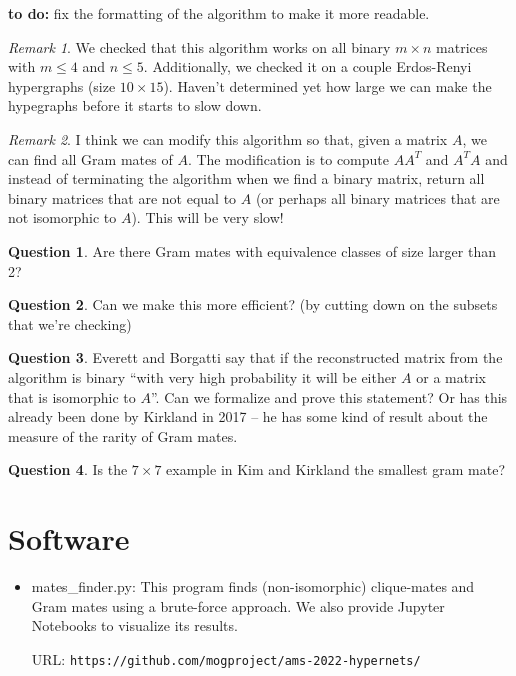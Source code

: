 \documentclass[11pt]{article}
\theoremstyle{definition}
\newtheorem{question}{Question}
\theoremstyle{remark}
\newtheorem{remark}{Remark}
\begin{document}
{\bf to do:} fix the formatting of the algorithm to make it more readable. 
	
\begin{remark}
We checked that this algorithm works on all binary $m \times n$ matrices with $m \leq 4$ and $n \leq 5$. Additionally, we checked it on a couple Erdos-Renyi hypergraphs (size $10 \times 15$). Haven't determined yet how large we can make the hypegraphs before it starts to slow down. 
\end{remark}
	
\begin{remark}
I think we can modify this algorithm so that, given a matrix $A$, we can find all Gram mates of $A$. The modification is to compute $AA^{T}$ and $A^{T}A$ and instead of terminating the algorithm when we find a binary matrix, return all binary matrices that are not equal to $A$ (or perhaps all binary matrices that are not isomorphic to $A$). This will be very slow!
\end{remark}

\begin{question}
Are there Gram mates with equivalence classes of size larger than 2?
\end{question}

\begin{question}
Can we make this more efficient? (by cutting down on the subsets that we're checking)
\end{question}

\begin{question}
Everett and Borgatti say that if the reconstructed matrix from the algorithm is binary ``with very high probability it will be either $A$ or a matrix that is isomorphic to $A$''. Can we formalize and prove this statement? Or has this already been done by Kirkland in 2017 -- he has some kind of result about the measure of the rarity of Gram mates. 
\end{question}

\begin{question}
Is the $7 \times 7$ example in Kim and Kirkland \cite{Kirkland} the smallest gram mate?
\end{question}



\section{Software}
\begin{itemize}
  \item \textsf{mates\_finder.py}: This program finds (non-isomorphic) clique-mates and Gram mates using a brute-force approach.
  We also provide Jupyter Notebooks to visualize its results.

  URL: \texttt{https://github.com/mogproject/ams-2022-hypernets/}

\end{itemize}



\end{document}
